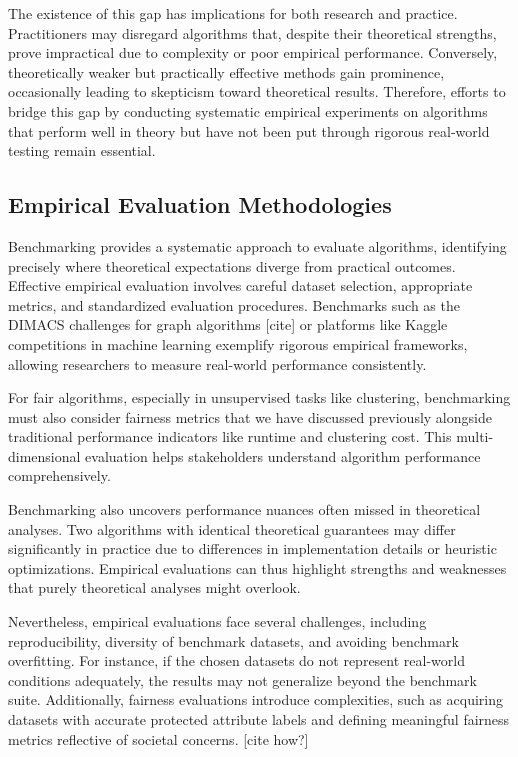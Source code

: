 The existence of this gap has implications for both research and
practice. Practitioners may disregard algorithms that, despite their
theoretical strengths, prove impractical due to complexity or poor
empirical performance. Conversely, theoretically weaker but
practically effective methods gain prominence, occasionally leading
to skepticism toward theoretical results. Therefore, efforts to
bridge this gap by conducting systematic empirical experiments on
algorithms that perform well in theory but have not been put through
rigorous real-world testing remain essential.

\subsection{Empirical Evaluation Methodologies}

Benchmarking provides a systematic approach to evaluate algorithms,
identifying precisely where theoretical expectations diverge from
practical outcomes. Effective empirical evaluation involves careful
dataset selection, appropriate metrics, and standardized evaluation
procedures. Benchmarks such as the DIMACS challenges for graph
algorithms [cite] or platforms like Kaggle competitions in machine learning
exemplify rigorous empirical frameworks, allowing researchers to
measure real-world performance consistently.

For fair algorithms, especially in unsupervised tasks like
clustering, benchmarking must also consider fairness metrics that we
have discussed previously
alongside traditional performance indicators like runtime and
clustering cost. This multi-dimensional evaluation helps stakeholders
understand algorithm performance comprehensively.

Benchmarking also uncovers performance nuances often missed in
theoretical analyses. Two algorithms with identical theoretical
guarantees may differ significantly in practice due to differences in
implementation details or heuristic optimizations. Empirical
evaluations can thus highlight strengths and weaknesses that purely
theoretical analyses might overlook.

Nevertheless, empirical evaluations face several challenges,
including reproducibility, diversity of benchmark datasets, and
avoiding benchmark overfitting. For instance, if the chosen datasets
do not represent real-world conditions adequately, the results may
not generalize beyond the benchmark suite. Additionally, fairness
evaluations introduce complexities, such as acquiring datasets with
accurate protected attribute labels and defining meaningful fairness
metrics reflective of societal concerns. [cite how?]

